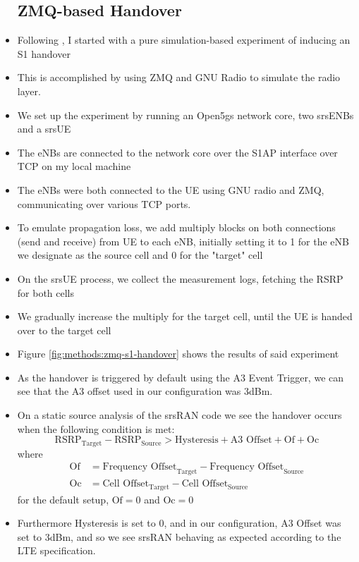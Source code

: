 \begin{itemize}
\subsection{ZMQ-based Handover}
    \item Following \cite{powell_handover_2021}, I started with a pure simulation-based experiment of inducing an S1 handover
    \item This is accomplished by using ZMQ and GNU Radio to simulate the radio layer.
    \item We set up the experiment by running an Open5gs network core, two srsENBs and a srsUE
    \item The eNBs are connected to the network core over the S1AP interface over TCP on my local machine
    \item The eNBs were both connected to the UE using GNU radio and ZMQ, communicating over various TCP ports.
    \item To emulate propagation loss, we add multiply blocks on both connections (send and receive) from UE to each eNB, initially setting it to 1 for the eNB we designate as the source cell and 0 for the "target" cell
    \item On the srsUE process, we collect the measurement logs, fetching the RSRP for both cells
    \item We gradually increase the multiply for the target cell, until the UE is handed over to the target cell
    \item Figure \ref{fig:methods:zmq-s1-handover} shows the results of said experiment
    \item As the handover is triggered by default using the A3 Event Trigger, we can see that the A3 offset used in our configuration was 3dBm.
    \item On a static source analysis of the srsRAN code we see the handover occurs when the following condition is met:
$$\text{RSRP}_\text{Target} - \text{RSRP}_\text{Source} > \text{Hysteresis} + \text{A3 Offset} + \text{Of} + \text{Oc}$$
where 
$$\begin{aligned}\text{Of} &= \text{Frequency Offset}_\text{Target} - \text{Frequency Offset}_\text{Source} \\
\text{Oc} &= \text{Cell Offset}_\text{Target} - \text{Cell Offset}_\text{Source}\end{aligned}$$
for the default setup, $\text{Of}=0$ and $\text{Oc}=0$
\item Furthermore Hysteresis is set to 0, and in our configuration, A3 Offset was set to 3dBm, and so we see srsRAN behaving as expected according to the LTE specification.
\end{itemize}
